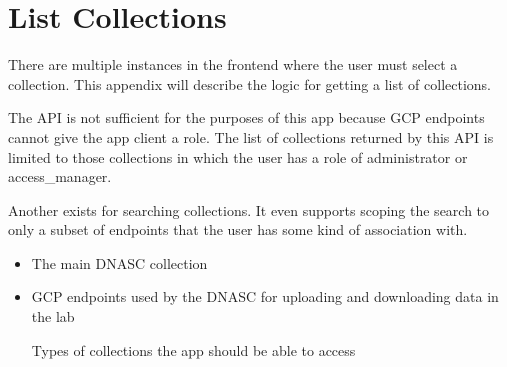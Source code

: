 
\section{List Collections}

There are multiple instances in the frontend where the user must select a collection.
This appendix will describe the logic for getting a list of collections.

The  API is not sufficient 
for the purposes of this app because GCP endpoints cannot give the app client 
a role. The list of collections returned by this API is limited to those collections 
in which the user has a role of administrator or access\_manager.

Another  exists for searching collections. It even
supports scoping the search to only a subset of endpoints that the user has
some kind of association with.

\begin{itemize}
    \item The main DNASC collection
    \item GCP endpoints used by the DNASC for uploading and downloading data
    in the lab
    \caption{Types of collections the app should be able to access}
\end{itemize}